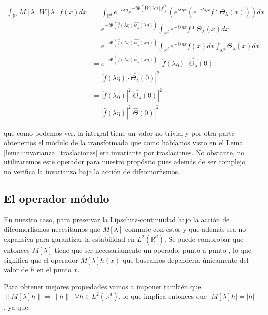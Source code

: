 \begin{align*}
  \int_{\mathbb{R}^d} M[\lambda]W[\lambda] f(x) dx &= \int_{\mathbb{R}^d} e^{-i\lambda \eta} e^{-i \Phi (\widehat{W[\lambda\eta]f})} \left( e^{i\lambda\eta x} \left( e^{-i\lambda\eta x} f \ast \Theta_\lambda (x)\right)\right) dx \\
  &= e^{-i \Phi (\widehat{f}(\lambda\eta)\widehat{\psi_\lambda}(\lambda\eta))} \int_{\mathbb{R}^d} e^{-i\lambda\eta x} f \ast \Theta_\lambda (x) dx \\
  &=e^{-i \Phi (\widehat{f}(\lambda\eta)\widehat{\psi_\lambda}(\lambda\eta))} \int_{\mathbb{R}^d}e^{-i\lambda\eta x} f(x) dx  \int_{\mathbb{R}^d}\Theta_\lambda (x) dx  \\
  &=e^{-i \Phi (\widehat{f}(\lambda\eta)\widehat{\psi_\lambda}(\lambda\eta))} \cdot \widehat{f}(\lambda\eta) \cdot  \widehat{\Theta_\lambda}(0)\\
  &=\left| \widehat{f}(\lambda\eta) \cdot  \widehat{\Theta_\lambda}(0) \right|^2 \\
  &=\left| \widehat{f}(\lambda\eta)\right|^2 \left| \widehat{\Theta_\lambda}(0) \right|^2  \\
  &=\left| \widehat{f}(\lambda\eta)\right|^2 \left| \widehat{\Theta}(0) \right|^2 
\end{align*}

\noindent que como podemos ver, la integral tiene un valor no trivial y por otra parte obtenemos el módulo de la transformada que como habíamos visto en el Lema \ref{lema::invarianza_traslaciones} era invariante por traslaciones. No obstante, no utilizaremos este operador para nuestro propósito pues además de ser complejo no verifica la invarianza bajo la acción de difeomorfismos.

\subsection{El operador módulo}

\noindent En nuestro caso, para preservar la Lipschitz-continuidad bajo la acción de difeomorfismos necesitamos que $M[\lambda]$ conmute con éstos y que además sea no expansiva para garantizar la estabilidad en $L^2(\mathbb{R}^d)$. Se puede comprobar que entonces $M[\lambda]$ tiene que ser necesariamente un operador punto a punto \cite{JBrunaOperatorsCommutingDiff}, lo que significa que el operador $M[\lambda]h(x)$ que buscamos dependería únicamente del valor de $h$ en el punto $x$.

\medskip

\noindent Para obtener mejores propiedades vamos a imponer también que $\|M[\lambda]h\|=\|h\| \; \; \forall h \in L^2(\mathbb{R}^d)$, lo que implica entonces que $|M[\lambda]h|=|h|$, ya que:  

